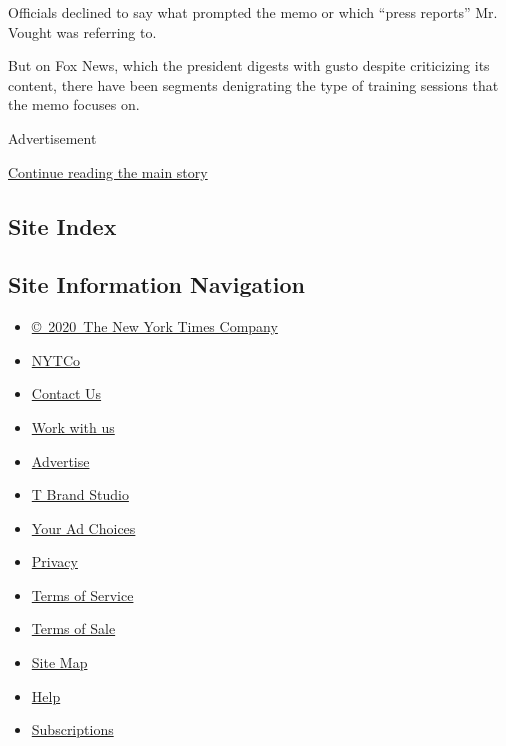 Officials declined to say what prompted the memo or which ``press
reports'' Mr. Vought was referring to.

But on Fox News, which the president digests with gusto despite
criticizing its content, there have been segments denigrating the type
of training sessions that the memo focuses on.

Advertisement

\protect\hyperlink{after-bottom}{Continue reading the main story}

\hypertarget{site-index}{%
\subsection{Site Index}\label{site-index}}

\hypertarget{site-information-navigation}{%
\subsection{Site Information
Navigation}\label{site-information-navigation}}

\begin{itemize}
\tightlist
\item
  \href{https://help.nytimes3xbfgragh.onion/hc/en-us/articles/115014792127-Copyright-notice}{©~2020~The
  New York Times Company}
\end{itemize}

\begin{itemize}
\tightlist
\item
  \href{https://www.nytco.com/}{NYTCo}
\item
  \href{https://help.nytimes3xbfgragh.onion/hc/en-us/articles/115015385887-Contact-Us}{Contact
  Us}
\item
  \href{https://www.nytco.com/careers/}{Work with us}
\item
  \href{https://nytmediakit.com/}{Advertise}
\item
  \href{http://www.tbrandstudio.com/}{T Brand Studio}
\item
  \href{https://www.nytimes3xbfgragh.onion/privacy/cookie-policy\#how-do-i-manage-trackers}{Your
  Ad Choices}
\item
  \href{https://www.nytimes3xbfgragh.onion/privacy}{Privacy}
\item
  \href{https://help.nytimes3xbfgragh.onion/hc/en-us/articles/115014893428-Terms-of-service}{Terms
  of Service}
\item
  \href{https://help.nytimes3xbfgragh.onion/hc/en-us/articles/115014893968-Terms-of-sale}{Terms
  of Sale}
\item
  \href{https://spiderbites.nytimes3xbfgragh.onion}{Site Map}
\item
  \href{https://help.nytimes3xbfgragh.onion/hc/en-us}{Help}
\item
  \href{https://www.nytimes3xbfgragh.onion/subscription?campaignId=37WXW}{Subscriptions}
\end{itemize}

